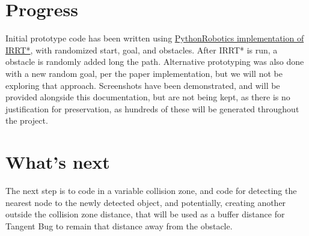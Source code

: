 \documentclass[12pt]{article}
\begin{document}
\section{Progress}
\indent \indent Initial prototype code has been written using \href{https://github.com/AtsushiSakai/PythonRobotics/tree/master/PathPlanning/InformedRRTStar}{PythonRobotics implementation of IRRT*}, with randomized
start, goal, and obstacles. After IRRT* is run, a obstacle is randomly added long the path. Alternative prototyping was also done with a new random goal, per the paper implementation,
but we will not be exploring that approach. Screenshots have been demonstrated, and will be
provided alongside this documentation, but are not being kept, as there is no justification
for preservation, as hundreds of these will be generated throughout the project.

\section{What's next}
\indent \indent The next step is to code in a variable collision zone, and code for detecting the nearest node to the newly detected object, and potentially, creating another outside the collision zone distance, that will be used as a buffer distance for Tangent Bug to remain that distance away from the
obstacle.
\end{document}
